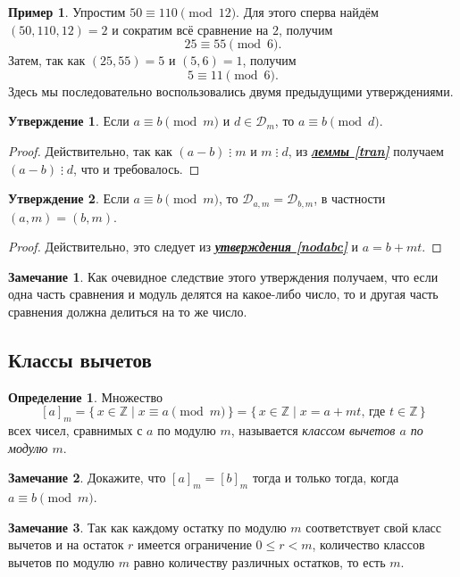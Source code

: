 \documentclass[14pt, a4paper]{extarticle}
\theoremstyle{definition}
\newtheorem*{definition}{Определение}
\newtheorem*{remark}{Замечание}
\newtheorem{example}{Пример}
\newtheorem{statement}{Утверждение}
\newcommand{\divisible}{\mathop{\vdots}}
\begin{document}
	\begin{example}
		Упростим $50\equiv110\pmod{12}$. Для этого сперва найдём $(50,110,12)=2$ и сократим всё сравнение на $2$, получим $$25\equiv55\pmod{6}.$$ Затем, так как $(25,55)=5$ и $(5,6)=1$, получим $$5\equiv11\pmod{6}.$$ Здесь мы последовательно воспользовались двумя предыдущими утверждениями.
	\end{example}

	\begin{statement}
		Если $a\equiv b\pmod{m}$ и $d\in\mathcal{D}_m$, то $a\equiv b\pmod{d}$.
	\end{statement}
	\begin{proof}
		Действительно, так как $(a-b)\divisible m$ и $m\divisible d$, из \hyperref[tran]{\textbf{\textit{леммы \ref*{tran}}}} получаем $(a-b)\divisible d$, что и требовалось.
	\end{proof}

	\begin{statement}
	\label{nodsr}
		Если $a\equiv b\pmod{m}$, то $\mathcal{D}_{a,m}=\mathcal{D}_{b,m}$, в частности $(a,m)=(b,m)$.
	\end{statement}
	\begin{proof}
		Действительно, это следует из \hyperref[nodabc]{\textbf{\textit{утверждения \ref*{nodabc}}}} и $a=b+mt$.
	\end{proof}
	\begin{remark}
		Как очевидное следствие этого утверждения получаем, что если одна часть сравнения и модуль делятся на какое-либо число, то и другая часть сравнения должна делиться на то же число.
	\end{remark}

\subsection{Классы вычетов}
\label{sysvych}

	\begin{definition}
		Множество $$[a]_m=\{\,x\in\mathbb{Z}\mid x\equiv a\pmod{m}\,\}=\{\,x\in\mathbb{Z}\mid x=a+mt\text{, где }t\in\mathbb{Z}\,\}$$ всех чисел, сравнимых с $a$ по модулю $m$, называется \emph{классом вычетов $a$ по модулю $m$}.
	\end{definition}
	
	\begin{remark}
		Докажите, что $[a]_m=[b]_m$ тогда и только тогда, когда $a\equiv b\pmod{m}$.
	\end{remark}
	
	\begin{remark}
		Так как каждому остатку по модулю $m$ соответствует свой класс вычетов и на остаток $r$ имеется ограничение $0\leqslant r<m$, количество классов вычетов по модулю $m$ равно количеству различных остатков, то есть $m$.
	\end{remark}
	
\end{document}
